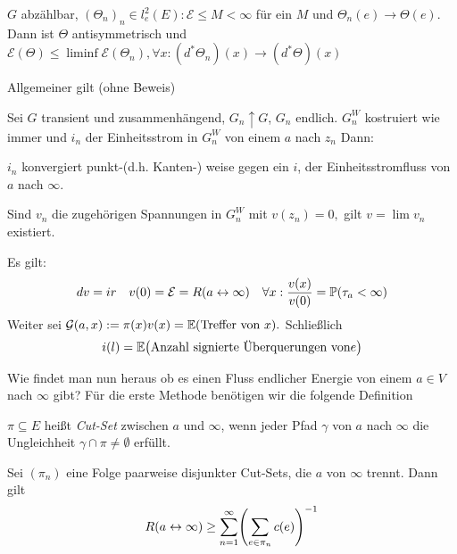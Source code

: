 \begin{uebung}
	$G$ abzählbar, $(\Theta_n)_n \in l^2_e(E): \mathcal{E} \leq M < \infty$ für ein $M$ und $\Theta_n(e) \to \Theta(e)$. Dann ist $\Theta$ antisymmetrisch und $\mathcal{E}(\Theta) \leq \liminf \mathcal{E}(\Theta_n), \forall x: (d^*\Theta_n)(x) \to (d^*\Theta)(x)$
\end{uebung}

Allgemeiner gilt (ohne Beweis)

	\begin{satz}
		Sei $G$ transient und zusammenhängend, $G_n \uparrow G$, $G_n$ endlich. $G_n^W$ kostruiert wie immer und $i_n$ der Einheitsstrom in $G^W_n$ von einem $a$ nach $z_n$ Dann:
		
		$i_n$ konvergiert punkt-(d.h. Kanten-) weise gegen ein $i$, der Einheitsstromfluss von $a$ nach $\infty$.

	Sind $v_n$ die zugehörigen Spannungen in $G^W_n$ mit $v(z_n) = 0,$ gilt $v  = \lim v_n$ existiert.

	Es gilt:
	\begin{align}
		dv = ir && v(0) = \mathcal{E} = R(a \leftrightarrow \infty) && \forall x: \frac{v(x)}{v(0)} = \prop{\tau_a < \infty}
	\end{align}
	Weiter sei $\mathcal{G}(a,x) := \pi(x)v(x) = \EW{\text{Treffer von }x}.$ Schließlich 
	\begin{equation}
		i(l) = \EW{\text{Anzahl signierte Überquerungen von}e} 
	\end{equation}

\end{satz}
Wie findet man nun heraus ob es einen Fluss endlicher Energie von einem $a\in V$ nach $\infty$ gibt? Für die erste Methode benötigen wir die folgende Definition
\begin{definition}
	$\pi \subseteq E$ heißt \emph{Cut-Set} zwischen $a$ und $\infty$, wenn jeder Pfad $\gamma$ von $a$ nach $\infty$ die Ungleichheit $\gamma \cap \pi \neq \emptyset$ erfüllt.
\end{definition}

\begin{satz}
	Sei $(\pi_n)$ eine Folge paarweise disjunkter Cut-Sets, die $a$ von $\infty$ trennt. Dann gilt 
	\begin{align}
		R(a \leftrightarrow \infty) \geq \sum\limits_{n = 1}^{\infty}\enb{\sum\limits_{e \in \pi_n} c(e)}^{-1}
	\end{align}
\end{satz}

